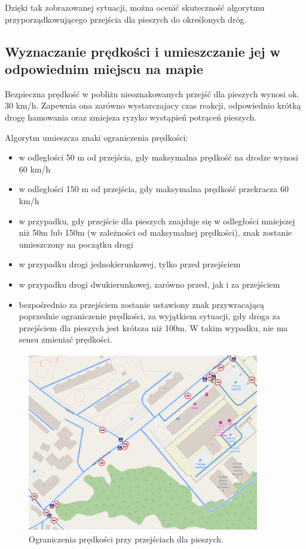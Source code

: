 Dzięki tak zobrazowanej sytuacji, można ocenić skuteczność algorytmu przyporządkowującego przejścia dla pieszych do określonych dróg.

\subsection{Wyznaczanie prędkości i umieszczanie jej w odpowiednim miejscu na mapie}

Bezpieczna prędkość w pobliżu nieoznakowanych przejść dla pieszych wynosi ok. 30 km/h. Zapewnia ona zarówno wystarczajacy czas reakcji, odpowiednio krótką drogę hamowania oraz zmiejsza ryzyko wystąpień potrąceń pieszych. 

Algorytm umieszcza znaki ograniczenia prędkości:
\begin{itemize}
\item w odległości 50 m od przejścia, gdy maksymalna prędkość na drodze wynosi 60 km/h
\item w odległości 150 m od przejścia, gdy maksymalna prędkość przekracza 60 km/h
\item w przypadku, gdy przejście dla pieszych znajduje się w odległości mniejszej niż 50m lub 150m (w zależności od maksymalnej prędkości), znak zostanie umieszczony na początku drogi
\item w przypadku drogi jednokierunkowej, tylko przed przejściem
\item w przypadku drogi dwukierunkowej, zarówno przed, jak i za przejściem
\item bezpośrednio za przejściem zostanie ustawiony znak przywracającą poprzednie ograniczenie prędkości, za wyjątkiem sytuacji, gdy droga za przejściem dla pieszych jest krótsza niż 100m. W takim wypadku, nie ma sensu zmieniać prędkości. 
\end{itemize}

\begin{figure}[h]
\caption{Ograniczenia prędkości przy przejściach dla pieszych.}
\label{sec:przejsciePredkosci}
\centering
\includegraphics[width=0.9\textwidth]{pedestrian_speed}
\end{figure}

